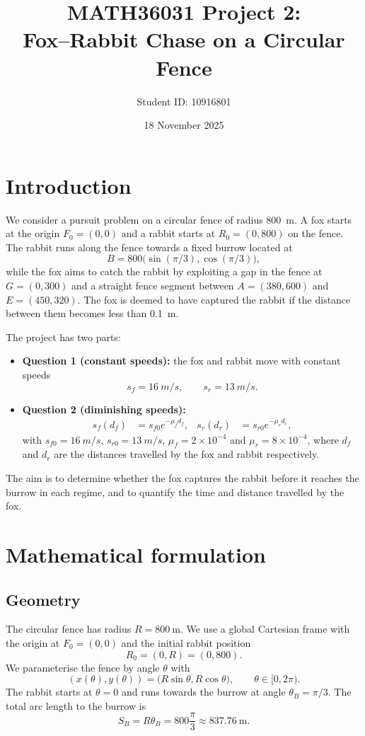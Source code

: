 \documentclass[a4paper,11pt]{article}
\title{MATH36031 Project 2:\\Fox--Rabbit Chase on a Circular Fence}
\author{Student ID: 10916801}
\date{18 November 2025}
\begin{document}
\maketitle

\section{Introduction}

We consider a pursuit problem on a circular fence of radius \SI{800}{\metre}. A fox starts at the origin $F_0=(0,0)$ and a rabbit starts at $R_0=(0,800)$ on the fence. The rabbit runs along the fence towards a fixed burrow located at
\[
B = 800\bigl(\sin(\pi/3),\cos(\pi/3)\bigr),
\]
while the fox aims to catch the rabbit by exploiting a gap in the fence at $G=(0,300)$ and a straight fence segment between $A=(380,600)$ and $E=(450,320)$. The fox is deemed to have captured the rabbit if the distance between them becomes less than \SI{0.1}{\metre}.

The project has two parts:
\begin{itemize}
  \item \textbf{Question 1 (constant speeds):} the fox and rabbit move with constant speeds
  \[
    s_f=\SI{16}{m/s}, \qquad s_r=\SI{13}{m/s}.
  \]
  \item \textbf{Question 2 (diminishing speeds):}
  \begin{align*}
    s_f(d_f) &= s_{f0} e^{-\mu_f d_f}, &
    s_r(d_r) &= s_{r0} e^{-\mu_r d_r},
  \end{align*}
  with $s_{f0}=\SI{16}{m/s}$, $s_{r0}=\SI{13}{m/s}$, $\mu_f=2\times 10^{-4}$ and $\mu_r=8\times 10^{-4}$, where $d_f$ and $d_r$ are the distances travelled by the fox and rabbit respectively.
\end{itemize}
The aim is to determine whether the fox captures the rabbit before it reaches the burrow in each regime, and to quantify the time and distance travelled by the fox.

\section{Mathematical formulation}

\subsection{Geometry}

The circular fence has radius $R=\SI{800}{\metre}$. We use a global Cartesian frame with the origin at $F_0=(0,0)$ and the initial rabbit position
\[
R_0 = (0,R) = (0,800).
\]
We parameterise the fence by angle $\theta$ with
\[
(x(\theta),y(\theta)) = \bigl(R\sin\theta, R\cos\theta\bigr), \qquad \theta\in[0,2\pi).
\]
The rabbit starts at $\theta=0$ and runs towards the burrow at angle $\theta_B=\pi/3$. The total arc length to the burrow is
\[
S_B = R\theta_B = 800\frac{\pi}{3} \approx \SI{837.76}{\metre}.
\]
\end{document}
